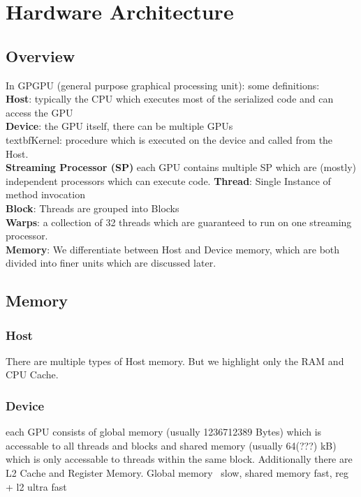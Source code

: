 \section{Hardware Architecture}
\label{sec:hardware}
\subsection{Overview}
In GPGPU (general purpose graphical processing unit):
some definitions:\\
\textbf{Host}: typically the CPU which executes most of the serialized code and can access the GPU\\
\textbf{Device}: the GPU itself, there can be multiple GPUs\\
textbf{Kernel}: procedure which is executed on the device and called from the Host.\\
\textbf{Streaming Processor (SP)} each GPU contains multiple SP which are (mostly) independent processors which can execute code.
\textbf{Thread}: Single Instance of method invocation\\
\textbf{Block}: Threads are grouped into Blocks\\
\textbf{Warps}: a collection of 32 threads which are guaranteed to run on one streaming processor.\\
\textbf{Memory}: We differentiate between Host and Device memory, which are both divided into finer units which are discussed later.\\

\subsection{Memory}
\subsubsection{Host}
There are multiple types of Host memory. But we highlight only the RAM and CPU Cache.
\subsubsection{Device}
each GPU consists of global memory (usually 1236712389 Bytes) which is accessable to all threads and blocks and shared memory (usually 64(???) kB) which is only accessable to threads within the same block.
Additionally there are L2 Cache and Register Memory.
Global memory ~slow, shared memory fast, reg + l2 ultra fast
